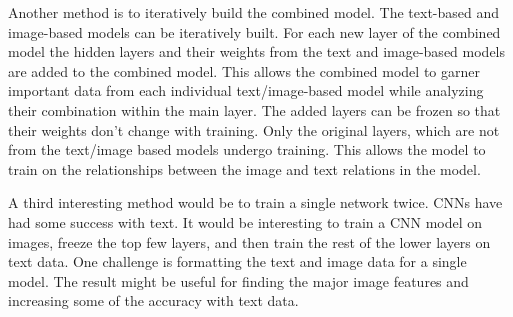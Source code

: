 
Another method is to iteratively build the combined model.  The text-based and image-based models can be iteratively built. For each new layer of the combined model the hidden layers and their weights from the text and image-based models are added to the combined model. This allows the combined model to garner important data from each individual text/image-based model while analyzing their combination within the main layer.  The added layers can be frozen so that their weights don't change with training.  Only the original layers, which are not from the text/image based models undergo training.  This allows the model to train on the relationships between the image and text relations in the model.

A third interesting method would be to train a single network twice. CNNs have had some success with text.  It would be interesting to train a CNN model on images, freeze the top few layers, and then train the rest of the lower layers on text data.  One challenge is formatting the text and image data for a single model.  The result might be useful for finding the major image features and increasing some of the accuracy with text data. 

